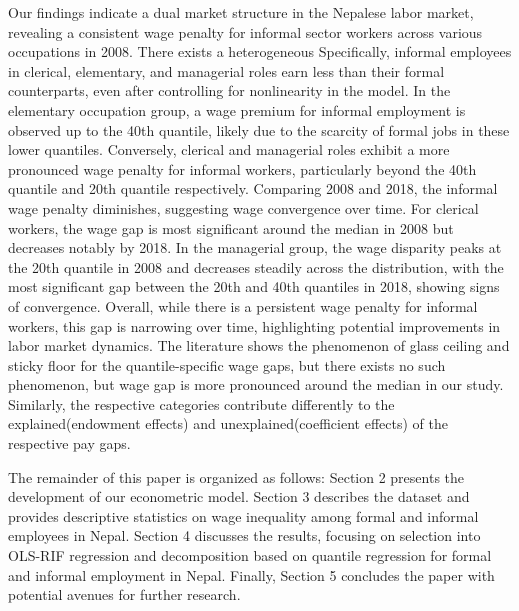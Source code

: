 Our findings indicate a dual market structure in the Nepalese labor market, revealing a consistent wage penalty for informal sector workers across various occupations in 2008. There exists a heterogeneous Specifically, informal employees in clerical, elementary, and managerial roles earn less than their formal counterparts, even after controlling for nonlinearity in the model. In the elementary occupation group, a wage premium for informal employment is observed up to the 40th quantile, likely due to the scarcity of formal jobs in these lower quantiles. Conversely, clerical and managerial roles exhibit a more pronounced wage penalty for informal workers, particularly beyond the 40th quantile and 20th quantile respectively. Comparing 2008 and 2018, the informal wage penalty diminishes, suggesting wage convergence over time. For clerical workers, the wage gap is most significant around the median in 2008 but decreases notably by 2018. In the managerial group, the wage disparity peaks at the 20th quantile in 2008 and decreases steadily across the distribution, with the most significant gap between the 20th and 40th quantiles in 2018, showing signs of convergence. Overall, while there is a persistent wage penalty for informal workers, this gap is narrowing over time, highlighting potential improvements in labor market dynamics. The literature shows the phenomenon of glass ceiling and sticky floor for the quantile-specific wage gaps, but there exists no such phenomenon, but wage gap is more pronounced around the median in our study. Similarly, the respective categories contribute differently to the explained(endowment effects) and unexplained(coefficient effects) of the respective pay gaps.

The remainder of this paper is organized as follows: Section 2 presents the development of our econometric model. Section 3 describes the dataset and provides descriptive statistics on wage inequality among formal and informal employees in Nepal. Section 4 discusses the results, focusing on selection into OLS-RIF regression and decomposition based on quantile regression for formal and informal employment in Nepal. Finally, Section 5 concludes the paper with potential avenues for further research.